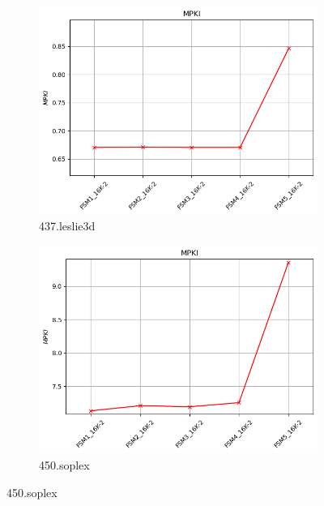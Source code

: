 \documentclass{article}
\begin{document}
\begin{figure}[H]
     \vspace{0.5cm} %
 
     \begin{subfigure}[b]{0.45\textwidth}
         \includegraphics[width=\textwidth]{figures/5_3_b/437.leslie3d.cslab_branch_preds_ref.out.png}
         \caption{437.leslie3d}
         \label{fig:plot25}
     \end{subfigure}
     \hfill
     \begin{subfigure}[b]{0.45\textwidth}
         \includegraphics[width=\textwidth]{figures/5_3_b/450.soplex.cslab_branch_preds_ref.out.png}
         \caption{450.soplex}
         \label{fig:plot26}
     \end{subfigure}
 

\end{figure}
\end{document}
